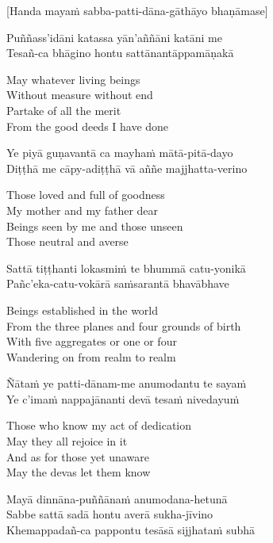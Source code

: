 \begin{center}
  [Handa mayaṁ sabba-patti-dāna-gāthāyo bhaṇāmase]
\end{center}

Puññass’idāni katassa yān’aññāni katāni me\\
Tesañ-ca bhāgino hontu sattānantāppamāṇakā

\begin{english}
  May whatever living beings\\
  Without measure without end\\
  Partake of all the merit\\
  From the good deeds I have done
\end{english}

Ye piyā guṇavantā ca mayhaṁ mātā-pitā-dayo\\
Diṭṭhā me cāpy-adiṭṭhā vā aññe majjhatta-verino

\begin{english}
  Those loved and full of goodness\\
  My mother and my father dear\\
  Beings seen by me and those unseen\\
  Those neutral and averse
\end{english}

Sattā tiṭṭhanti lokasmiṁ te bhummā catu-yonikā\\
Pañc’eka-catu-vokārā saṁsarantā bhavābhave

\begin{english}
  Beings established in the world\\
  From the three planes and four grounds of birth\\
  With five aggregates or one or four\\
  Wandering on from realm to realm
\end{english}

Ñātaṁ ye patti-dānam-me anumodantu te sayaṁ\\
Ye c’imaṁ nappajānanti devā tesaṁ nivedayuṁ

\begin{english}
  Those who know my act of dedication\\
  May they all rejoice in it\\
  And as for those yet unaware\\
  May the devas let them know
\end{english}

Mayā dinnāna-puññānaṁ anumodana-hetunā\\
Sabbe sattā sadā hontu averā sukha-jīvino\\
Khemappadañ-ca pappontu tesāsā sijjhataṁ subhā

